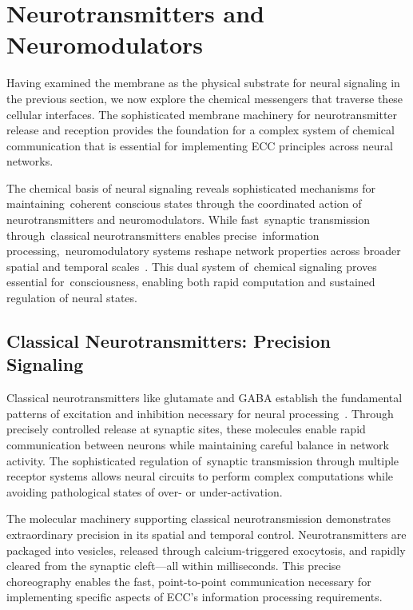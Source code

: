 \section{Neurotransmitters and Neuromodulators~~}

Having examined the membrane as the physical substrate for neural signaling in the previous section, we now explore the chemical messengers that traverse these cellular interfaces. The sophisticated membrane machinery for neurotransmitter release and reception provides the foundation for a complex system of chemical communication that is essential for implementing ECC principles across neural networks.

The chemical basis of neural signaling reveals sophisticated mechanisms for maintaining~coherent conscious states through the coordinated action of neurotransmitters and neuromodulators. While fast~synaptic transmission through~classical neurotransmitters enables precise~information processing,~neuromodulatory systems reshape network properties across broader spatial and temporal scales~\cite{Nadim2014, Marder2012}. This dual system of~chemical signaling proves essential for~consciousness, enabling both rapid computation and sustained regulation of neural states.

\subsection*{Classical Neurotransmitters: Precision Signaling~}

Classical neurotransmitters like glutamate and GABA establish the fundamental patterns of excitation and inhibition necessary for neural processing~\cite{Froemke2015, Choquet2013}. Through precisely controlled release at synaptic sites, these molecules enable rapid communication between neurons while maintaining careful balance in network activity. The sophisticated regulation of~synaptic transmission through multiple receptor systems allows neural circuits to perform complex computations while avoiding pathological states of over- or under-activation.

The molecular machinery supporting classical neurotransmission demonstrates extraordinary precision in its spatial and temporal control. Neurotransmitters are packaged into vesicles, released through calcium-triggered exocytosis, and rapidly cleared from the synaptic cleft—all within milliseconds. This precise choreography enables the fast, point-to-point communication necessary for implementing specific aspects of ECC's information processing requirements.

